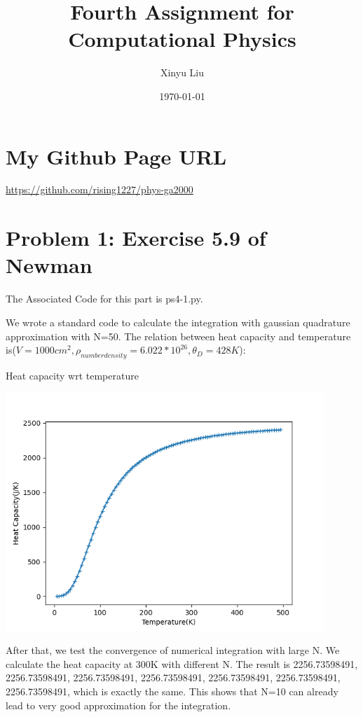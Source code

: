 \documentclass[letterpaper,12pt]{article}
\title{Fourth Assignment for Computational Physics}
\date{\today}
\author{Xinyu Liu}
\begin{document}
\maketitle
\tableofcontents

\newpage

\section{My Github Page URL}
\url{https://github.com/rising1227/phys-ga2000}

\section{Problem 1: Exercise 5.9 of Newman}

The Associated Code for this part is ps4-1.py.

We wrote a standard code to calculate the integration with gaussian quadrature approximation with N=50. The relation between heat capacity and temperature is($V=1000cm^2,\rho_{numberdensity} = 6.022*10^{26},\theta_D = 428K$):

\begin{table}[!h]
    \centering
    \caption{Heat capacity wrt temperature}
    \includegraphics[width=12cm]{ps4-1-2.png}
\end{table}%

After that, we test the convergence of numerical integration with large N. We calculate the heat capacity at 300K with different N. The result is 2256.73598491, 2256.73598491, 2256.73598491, 2256.73598491, 2256.73598491, 2256.73598491, 2256.73598491, which is exactly the same. This shows that N=10 can already lead to very good approximation for the integration.
\end{document}
